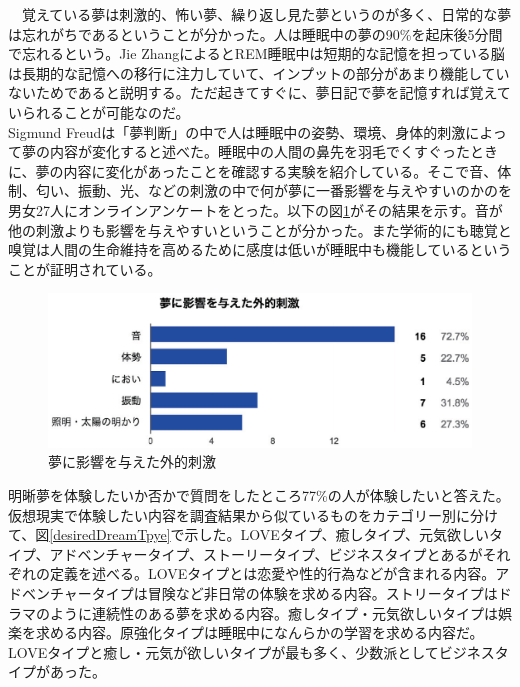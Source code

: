 　覚えている夢は刺激的、怖い夢、繰り返し見た夢というのが多く、日常的な夢は忘れがちであるということが分かった。人は睡眠中の夢の90\%を起床後5分間で忘れるという。Jie ZhangによるとREM睡眠中は短期的な記憶を担っている脳は長期的な記憶への移行に注力していて、インプットの部分があまり機能していないためであると説明する。ただ起きてすぐに、夢日記で夢を記憶すれば覚えていられることが可能なのだ\cite{forgetDreams}。\\

Sigmund Freudは「夢判断」の中で人は睡眠中の姿勢、環境、身体的刺激によって夢の内容が変化すると述べた\cite{freud}。睡眠中の人間の鼻先を羽毛でくすぐったときに、夢の内容に変化があったことを確認する実験を紹介している。そこで音、体制、匂い、振動、光、などの刺激の中で何が夢に一番影響を与えやすいのかのを男女27人にオンラインアンケートをとった。以下の図\ref{externalShigeki}がその結果を示す。音が他の刺激よりも影響を与えやすいということが分かった。また学術的にも聴覚と嗅覚は人間の生命維持を高めるために感度は低いが睡眠中も機能しているということが証明されている\cite{Zhang}。\\

\begin{figure}[htbp]
\begin{center}
\includegraphics[width=15cm]{eps/input.eps}
\caption{夢に影響を与えた外的刺激}
\label{externalShigeki}
\end{center}
\end{figure}

明晰夢を体験したいか否かで質問をしたところ77\%の人が体験したいと答えた。仮想現実で体験したい内容を調査結果から似ているものをカテゴリー別に分けて、図\ref{desiredDreamTpye}で示した。LOVEタイプ、癒しタイプ、元気欲しいタイプ、アドベンチャータイプ、ストーリータイプ、ビジネスタイプとあるがそれぞれの定義を述べる。LOVEタイプとは恋愛や性的行為などが含まれる内容。アドベンチャータイプは冒険など非日常の体験を求める内容。ストリータイプはドラマのように連続性のある夢を求める内容。癒しタイプ・元気欲しいタイプは娯楽を求める内容。原強化タイプは睡眠中になんらかの学習を求める内容だ。LOVEタイプと癒し・元気が欲しいタイプが最も多く、少数派としてビジネスタイプがあった。\\

